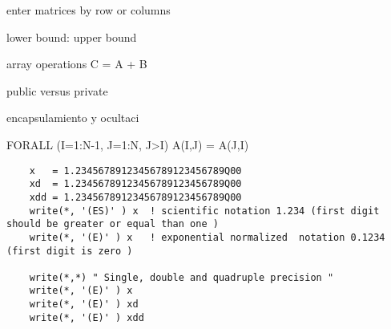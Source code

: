     enter matrices by row or columns 
    
    
    lower bound: upper bound 
    
    
    array operations C = A + B 
    
    public versus private 
    
    
    encapsulamiento y ocultaci%
    
    
    FORALL (I=1:N-1, J=1:N, J>I) A(I,J) = A(J,I)
    
    
    \begin{verbatim} 
    x   = 1.23456789123456789123456789Q00
    xd  = 1.23456789123456789123456789Q00
    xdd = 1.23456789123456789123456789Q00
    write(*, '(ES)' ) x  ! scientific notation 1.234 (first digit should be greater or equal than one ) 
    write(*, '(E)' ) x   ! exponential normalized  notation 0.1234 (first digit is zero ) 
    
    write(*,*) " Single, double and quadruple precision "
    write(*, '(E)' ) x 
    write(*, '(E)' ) xd
    write(*, '(E)' ) xdd
    
    \end{verbatim}
    
    
    
